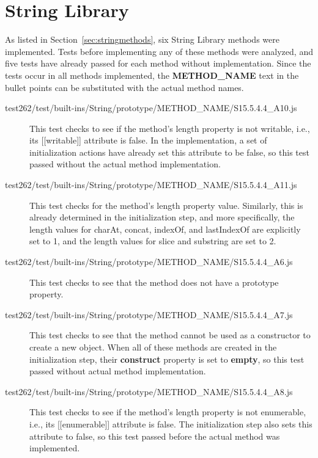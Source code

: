 \documentclass[a4paper,11pt,twoside]{report}
\begin{document}
\section{String Library}
As listed in Section~\ref{sec:stringmethods}, six String Library methods were implemented. Tests before implementing any of these methods were analyzed, and five tests have already passed for each method without implementation. Since the tests occur in all methods implemented, the \textbf{METHOD\_NAME} text in the bullet points can be substituted with the actual method names.

\begin{description}
\item[test262/test/built-ins/String/prototype/METHOD\_NAME/S15.5.4.4\_A10.js] This test checks to see if the method's length property is not writable, i.e., its [[writable]] attribute is false. In the implementation, a set of initialization actions have already set this attribute to be false, so this test passed without the actual method implementation.

\item[test262/test/built-ins/String/prototype/METHOD\_NAME/S15.5.4.4\_A11.js] This test checks for the method's length property value. Similarly, this is already determined in the initialization step, and more specifically, the length values for charAt, concat, indexOf, and lastIndexOf are explicitly set to 1, and the length values for slice and substring are set to 2.

\item[test262/test/built-ins/String/prototype/METHOD\_NAME/S15.5.4.4\_A6.js] This test checks to see that the method does not have a prototype property.

\item[test262/test/built-ins/String/prototype/METHOD\_NAME/S15.5.4.4\_A7.js] This test checks to see that the method cannot be used as a constructor to create a new object. When all of these methods are created in the initialization step, their \textbf{construct} property is set to \textbf{empty}, so this test passed without actual method implementation.

\item[test262/test/built-ins/String/prototype/METHOD\_NAME/S15.5.4.4\_A8.js] This test checks to see if the method's length property is not enumerable, i.e., its [[enumerable]] attribute is false. The initialization step also sets this attribute to false, so this test passed before the actual method was implemented.
\end{description}
\end{document}

